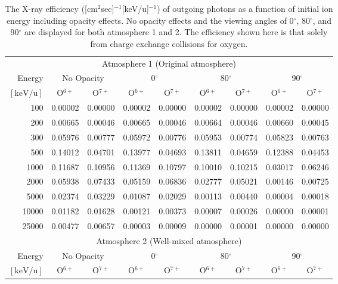 \begin{table}[ht]
    \centering
    \caption{The X-ray efficiency ([cm$^2$sec]$^{-1}$[keV/u]$^{-1}$) of outgoing photons as a function of initial ion energy including opacity effects. No opacity effects and the viewing angles of 0$^\circ$, 80$^\circ$, and 90$^\circ$ are displayed for both atmosphere 1 and 2. The efficiency shown here is that solely from charge exchange collisions for oxygen.}
    \begin{tabular}{r|c|c|c|c|c|c|c|c}
    \multicolumn{9}{c}{Atmosphere 1 (Original atmosphere)} \\ \cline{2-9}
    Energy & \multicolumn{2}{c|}{No Opacity} & \multicolumn{2}{c|}{0$^\circ$} & \multicolumn{2}{c|}{80$^\circ$} & \multicolumn{2}{c}{90$^\circ$} \\ \cline{2-9}
    $\mathrm{[keV/u]}$ & O$^{6+}$ & O$^{7+}$ & O$^{6+}$ & O$^{7+}$ & O$^{6+}$ & O$^{7+}$ & O$^{6+}$ & O$^{7+}$ \\ \cline{1-9}
    100   & 0.00002 & 0.00000 & 0.00002 & 0.00000 & 0.00002 & 0.00000 & 0.00002 & 0.00000 \\
    200   & 0.00665 & 0.00046 & 0.00665 & 0.00046 & 0.00664 & 0.00046 & 0.00660 & 0.00045 \\
    300   & 0.05976 & 0.00777 & 0.05972 & 0.00776 & 0.05953 & 0.00774 & 0.05823 & 0.00763 \\
    500   & 0.14012 & 0.04701 & 0.13977 & 0.04693 & 0.13811 & 0.04659 & 0.12388 & 0.04453 \\
    1000  & 0.11687 & 0.10956 & 0.11369 & 0.10797 & 0.10010 & 0.10215 & 0.03017 & 0.06246 \\
    2000  & 0.05938 & 0.07433 & 0.05159 & 0.06836 & 0.02777 & 0.05021 & 0.00146 & 0.00725 \\
    5000  & 0.02374 & 0.03229 & 0.01087 & 0.02029 & 0.00113 & 0.00440 & 0.00004 & 0.00018 \\
    10000 & 0.01182 & 0.01628 & 0.00121 & 0.00373 & 0.00007 & 0.00026 & 0.00000 & 0.00001 \\
    25000 & 0.00477 & 0.00657 & 0.00003 & 0.00009 & 0.00000 & 0.00001 & 0.00000 & 0.00000 \\ \cline{1-9}
    \multicolumn{9}{c}{Atmosphere 2 (Well-mixed atmosphere)} \\ \cline{2-9}
    Energy & \multicolumn{2}{c|}{No Opacity} & \multicolumn{2}{c|}{0$^\circ$} & \multicolumn{2}{c|}{80$^\circ$} & \multicolumn{2}{c}{90$^\circ$} \\ \cline{2-9}
    $\mathrm{[keV/u]}$ & O$^{6+}$ & O$^{7+}$ & O$^{6+}$ & O$^{7+}$ & O$^{6+}$ & O$^{7+}$ & O$^{6+}$ & O$^{7+}$ \\ \cline{1-9}

\end{tabular}
\end{table}
